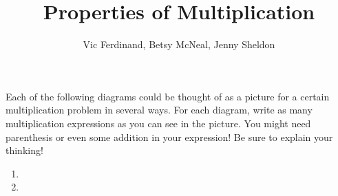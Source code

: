 \documentclass{ximera}
\title{Properties of Multiplication}
\author{Vic Ferdinand, Betsy McNeal, Jenny Sheldon}
\begin{document}
\begin{abstract} \end{abstract}
\maketitle



\begin{problem}

 Each of the following diagrams could be thought of as a picture for a certain multiplication problem in several ways.  For each diagram, write as many multiplication expressions as you can see in the picture.  You might need parenthesis or even some addition in your expression!  Be sure to explain your thinking!
\begin{enumerate}
    \setlength\itemsep{1cm}
    \item \leavevmode\vadjust{\vspace{-\baselineskip}}
    \item \leavevmode\vadjust{\vspace{-\baselineskip}}
\end{enumerate}
\end{problem}
\end{document}
